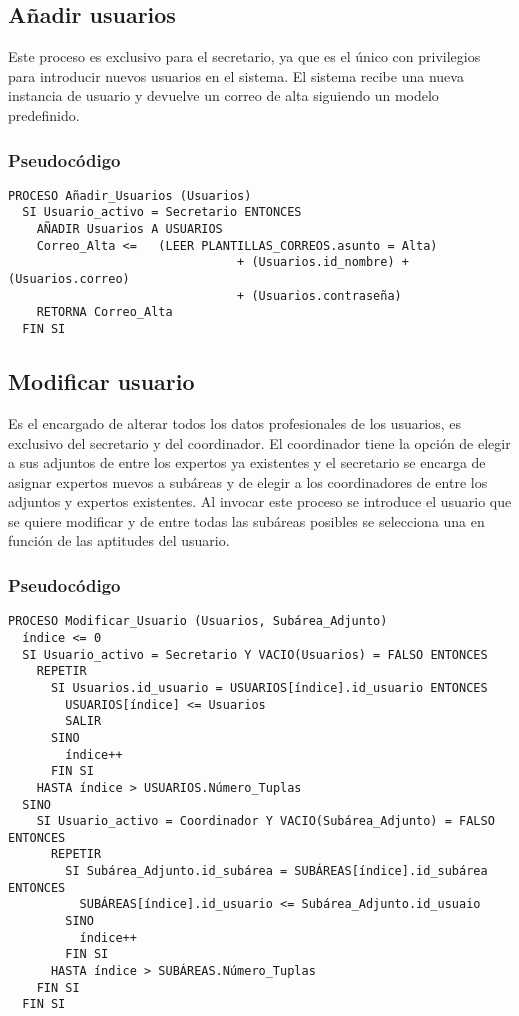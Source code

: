 \documentclass[12pt,a4paper,spanish,twoside]{book}
\begin{document}
\subsection{Añadir usuarios}
Este proceso es exclusivo para el secretario, ya que es el único con
privilegios para introducir nuevos usuarios en el sistema. El sistema recibe
una nueva instancia de usuario y devuelve un correo de alta siguiendo un
modelo predefinido.

\subsubsection{Pseudocódigo}
\begin{lstlisting}[inputencoding=utf8/latin1]
PROCESO Añadir_Usuarios (Usuarios)
  SI Usuario_activo = Secretario ENTONCES
    AÑADIR Usuarios A USUARIOS
    Correo_Alta <=   (LEER PLANTILLAS_CORREOS.asunto = Alta)
                                + (Usuarios.id_nombre) + (Usuarios.correo)
                                + (Usuarios.contraseña)
    RETORNA Correo_Alta
  FIN SI
\end{lstlisting}

\subsection{Modificar usuario}
Es el encargado de alterar todos los datos profesionales de los usuarios, es
exclusivo del secretario y del coordinador. El coordinador tiene la opción de
elegir a sus adjuntos de entre los expertos ya existentes y el secretario se
encarga de asignar expertos nuevos a subáreas y de elegir a los coordinadores
de entre los adjuntos y expertos existentes. Al invocar este proceso se
introduce el usuario que se quiere modificar y de entre todas las subáreas
posibles se selecciona una en función de las aptitudes del usuario. 

\subsubsection{Pseudocódigo}
\begin{lstlisting}[inputencoding=utf8/latin1]
PROCESO Modificar_Usuario (Usuarios, Subárea_Adjunto)
  índice <= 0
  SI Usuario_activo = Secretario Y VACIO(Usuarios) = FALSO ENTONCES
    REPETIR
      SI Usuarios.id_usuario = USUARIOS[índice].id_usuario ENTONCES
        USUARIOS[índice] <= Usuarios
        SALIR
      SINO
        índice++
      FIN SI
    HASTA índice > USUARIOS.Número_Tuplas
  SINO
    SI Usuario_activo = Coordinador Y VACIO(Subárea_Adjunto) = FALSO ENTONCES
      REPETIR
        SI Subárea_Adjunto.id_subárea = SUBÁREAS[índice].id_subárea ENTONCES
          SUBÁREAS[índice].id_usuario <= Subárea_Adjunto.id_usuaio
        SINO
          índice++
        FIN SI
      HASTA índice > SUBÁREAS.Número_Tuplas
    FIN SI
  FIN SI
\end{lstlisting}
\end{document}
